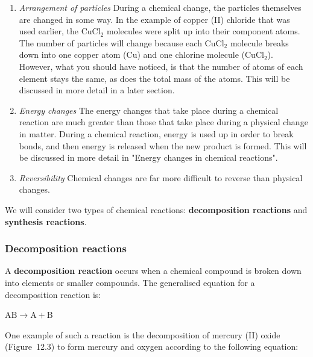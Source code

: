       \label{m38709*id62869}\begin{enumerate}[noitemsep, label=\textbf{\arabic*}. ] 
            \label{m38709*uid6}\item \textsl{Arrangement of particles}\newline
During a chemical change, the particles themselves are changed in some way. In the example of copper (II) chloride that was used earlier, the $\mathrm{CuCl}{}_{2}$ molecules were split up into their component atoms. The number of particles will change because each $\mathrm{CuCl}{}_{2}$ molecule breaks down into one copper atom ($\mathrm{Cu}$) and one chlorine molecule ($\mathrm{CuCl}{}_{2}$). However, what you should have noticed, is that the number of atoms of each element stays the same, as does the total mass of the atoms. This will be discussed in more detail in a later section.
\label{m38709*uid7}\item \textsl{Energy changes}\newline
The energy changes that take place during a chemical reaction are much greater than those that take place during a physical change in matter. During a chemical reaction, energy is used up in order to break bonds, and then energy is released when the new product is formed. This will be discussed in more detail in "Energy changes in chemical reactions".
\label{m38709*uid8}\item \textsl{Reversibility}\newline
Chemical changes are far more difficult to reverse than physical changes.
\end{enumerate}
      \label{m38709*id62997}We will consider two types of chemical reactions: \textbf{decomposition reactions} and \textbf{synthesis reactions}.\par 
      \label{m38709*uid9}
            \subsubsection*{Decomposition reactions}
            \nopagebreak
            \label{m38709*id63019}A \textbf{decomposition reaction} occurs when a chemical compound is broken down into elements or smaller compounds. The generalised equation for a decomposition reaction is:\par 
        \label{m38709*id63029}$\mathrm{AB}\to \mathrm{A}+\mathrm{B}$\par 
        \label{m38709*id63040}One example of such a reaction is the decomposition of mercury (II) oxide (Figure~12.3) to form mercury and oxygen according to the following equation:
\label{m38709*id734}\nopagebreak\noindent{}

